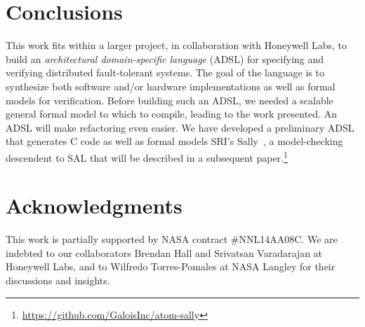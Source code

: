\documentclass{llncs/llncs}
\newcommand{\lee}[1]{ } %
\newcommand{\lee}[1]{ {\color{blue}$<$lee: #1$>$} } %
\begin{document}
\section{Conclusions}\label{sec:conclusions}
This work fits within a larger project, in collaboration with Honeywell Labs, to build an \emph{architectural domain-specific language} (ADSL) for specifying and verifying distributed fault-tolerant systems. The goal of the language is to synthesize both software and/or hardware implementations as well as formal models for verification. Before building such an ADSL, we needed a scalable general formal model to which to compile, leading to the work presented. An ADSL will make refactoring even easier. We have developed a preliminary ADSL that generates C code as well as formal models SRI's Sally~\cite{}, a model-checking descendent to SAL that will be described in a subsequent paper.\footnote{\url{https://github.com/GaloisInc/atom-sally}}

\lee{link to all results in github}
\lee{talk about compositional verification of properties, even though SAL doesn't directly support it}
\lee{talk about k-induction vs. PDR}
\lee{talk about lack of axiomatization in model-checking (multiple rushby bugs), but  tradeoff of deadlock. see proglema paper}
\lee{note some details still elided for implementation ---e.g., CRCs, etc.}

\section*{Acknowledgments}
This work is partially supported by NASA contract \#NNL14AA08C. We are indebted to our collaborators Brendan Hall and Srivatsan Varadarajan at Honeywell Labs, and to Wilfredo Torres-Pomales at NASA Langley for their discussions and insights.



\end{document}
